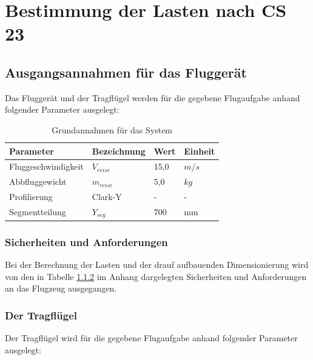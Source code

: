 \chapter{Bestimmung der Lasten nach CS 23}\label{cha:Bestimmung der Lasten nach CS 23}

\section{Ausgangsannahmen für das Fluggerät}

Das Fluggerät und der Tragflügel werden für die gegebene Flugaufgabe anhand folgender Parameter ausgelegt:

\begin{table}[h]
\centering
\begin{tabular}{|l|l|l|l|}
\hline
Parameter  & Bezeichnung &  Wert & Einheit \\ \hline
Fluggeschwindigkeit  & $V_{reise}$ & 15,0 & $m/s$\\ \hline
Abbfluggewicht & $m_{reise}$  & 5,0 & $kg$\\ \hline
Profilierung & Clark-Y & - & - \\ \hline
Segmentteilung & $Y_{seg}$ & 700 & mm\\ \hline
\end{tabular}
\caption{Grundannahmen für das System}
\label{tab:Grundannahmen für das System}
\end{table}

\subsection{Sicherheiten und Anforderungen}

Bei der Berechnung der Lasten und der drauf aufbauenden Dimensionierung wird von den in Tabelle \ref{} im Anhang dargelegten Sicherheiten und Anforderungen an das Flugzeug  ausgegangen.

\subsection{Der Tragflügel}

Der Tragflügel wird für die gegebene Flugaufgabe anhand folgender Parameter ausgelegt:


